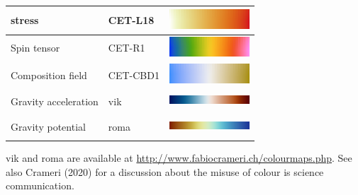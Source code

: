 \begin{center}
\begin{tabular}{lll}
\hline
stress & CET-L18 &  \includegraphics[width=3cm]{images/colourscales/CET-L18}\\
\hline
Spin tensor & CET-R1 &  \includegraphics[width=3cm]{images/colourscales/CET-R1}\\
\hline
Composition field & CET-CBD1 & \includegraphics[width=3cm]{images/colourscales/CET-CBD1}\\
\hline
Gravity acceleration & vik &  \includegraphics[width=3cm,height=7mm]{images/colourscales/vik}\\
\hline
Gravity potential & roma &  \includegraphics[width=3cm,height=7mm]{images/colourscales/roma}\\
\hline
\end{tabular}
\end{center}

vik and roma are available at \url{http://www.fabiocrameri.ch/colourmaps.php}.
See also Crameri \etal (2020) for a discussion about the misuse of 
colour is science communication.





